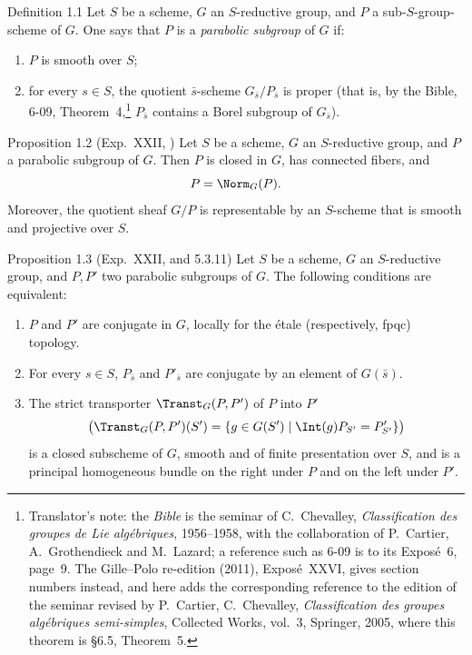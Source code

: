 \begin{sgastatement}{Definition 1.1}
Let \(S\) be a scheme, \(G\) an \(S\)-reductive group, and \(P\) a
sub-\(S\)-group-scheme of \(G\).  One says that \(P\) is a
\emph{parabolic subgroup} of \(G\) if:
\begin{enumerate}[label=\textup{(\roman*)}]
\item \(P\) is smooth over \(S\);
\item for every \(s\in S\), the quotient \(\bar s\)-scheme
\(G_{\bar s}/P_{\bar s}\) is proper (that is, by the Bible, 6-09, Theorem~4,\footnote{Translator's note: the \emph{Bible} is the seminar of C.~Chevalley,
\textit{Classification des groupes de Lie algébriques}, 1956--1958, with the
collaboration of P.~Cartier, A.~Grothendieck and M.~Lazard; a reference such
as 6-09 is to its Exposé~6, page~9. The Gille--Polo re-edition (2011),
Exposé~XXVI, gives section numbers instead, and here adds the corresponding
reference to the edition of the seminar revised by P.~Cartier,
C.~Chevalley, \textit{Classification des groupes algébriques semi-simples},
Collected Works, vol.~3, Springer, 2005, where this theorem is §6.5,
Theorem~5.}
\(P_{\bar s}\) contains a Borel subgroup of \(G_{\bar s}\)).
\end{enumerate}
\end{sgastatement}

\begin{sgastatement}{Proposition 1.2 \textup{(Exp.\ XXII, )}}
Let \(S\) be a scheme, \(G\) an \(S\)-reductive group, and \(P\) a parabolic
subgroup of \(G\).  Then \(P\) is closed in \(G\), has connected fibers, and
\[
  P=\Norm_G(P).
\]
Moreover, the quotient sheaf \(G/P\) is representable by an \(S\)-scheme
that is smooth and projective over \(S\).
\end{sgastatement}

\begin{sgastatement}{Proposition 1.3 \textup{(Exp.\ XXII,  and 5.3.11)}}
Let \(S\) be a scheme, \(G\) an \(S\)-reductive group, and \(P,P'\) two
parabolic subgroups of \(G\).  The following conditions are equivalent:
\begin{enumerate}[label=\textup{(\roman*)}]
\item \(P\) and \(P'\) are conjugate in \(G\), locally for the étale
\textup{(respectively, fpqc)} topology.
\item For every \(s\in S\), \(P_{\bar s}\) and \(P'_{\bar s}\) are conjugate
by an element of \(G(\bar s)\).
\item The strict transporter \(\Transt_G(P,P')\) of \(P\) into \(P'\)
\[
 \bigl(\Transt_G(P,P')(S')
 =\{g\in G(S')\mid \Int(g)P_{S'}=P'_{S'}\}\bigr)
\]
is a closed subscheme of \(G\), smooth and of finite presentation over
\(S\), and is a principal homogeneous bundle on the right under \(P\) and
on the left under \(P'\).
\end{enumerate}
\end{sgastatement}

